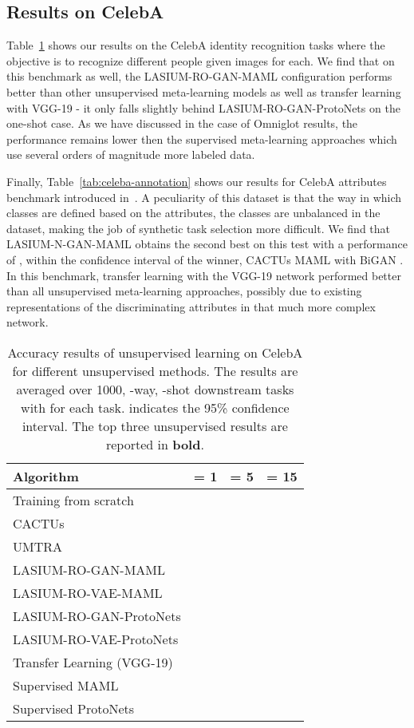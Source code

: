 \documentclass{article}
\begin{document}
\subsection{Results on CelebA}

Table~\ref{tab:gan_celeba} shows our results on the CelebA identity recognition tasks where the objective is to recognize  different people given  images for each. We find that on this benchmark as well, the LASIUM-RO-GAN-MAML configuration performs better than other unsupervised meta-learning models as well as transfer learning with VGG-19 - it only falls slightly behind LASIUM-RO-GAN-ProtoNets on the one-shot case. As we have discussed in the case of Omniglot results, the performance remains lower then the supervised meta-learning approaches which use several orders of magnitude more labeled data. 

Finally, Table~\ref{tab:celeba-annotation} shows our results for CelebA attributes benchmark introduced in~\cite{hsu2018unsupervised}. A peculiarity of this dataset is that the way in which classes are defined based on the attributes, the classes are unbalanced in the dataset, making the job of synthetic task selection more difficult. We find that LASIUM-N-GAN-MAML obtains the second best on this test with a performance of , within the confidence interval of the winner, CACTUs MAML with BiGAN . In this benchmark, transfer learning with the VGG-19 network performed better than all unsupervised meta-learning approaches, possibly due to existing representations of the discriminating attributes in that much more complex network.



\begin{table}[]
    \caption{Accuracy results of unsupervised learning on CelebA for different unsupervised methods. The results are averaged over 1000, -way, -shot downstream tasks with  for each task.  indicates the 95\% confidence interval. The top three unsupervised results are reported in {\bf bold}.}
    \label{tab:gan_celeba}
    \centering
    {\footnotesize
        \begin{tabular}{llll}
            \toprule
            Algorithm &  = 1 &  = 5 &  = 15 \\
            \midrule
            Training from scratch &  &  & \\
CACTUs
&  &  &  \\
UMTRA &  &  &  \\
LASIUM-RO-GAN-MAML &  &  &  \\
LASIUM-RO-VAE-MAML &  &  &  \\
LASIUM-RO-GAN-ProtoNets &  &  &  \\
            LASIUM-RO-VAE-ProtoNets &  &  &  \\
            \midrule
            Transfer Learning (VGG-19) &  &  &  \\
            Supervised MAML &  &  &  \\
            Supervised ProtoNets &  &  & \\
            \bottomrule
        \end{tabular}
    }
\end{table}
\end{document}
